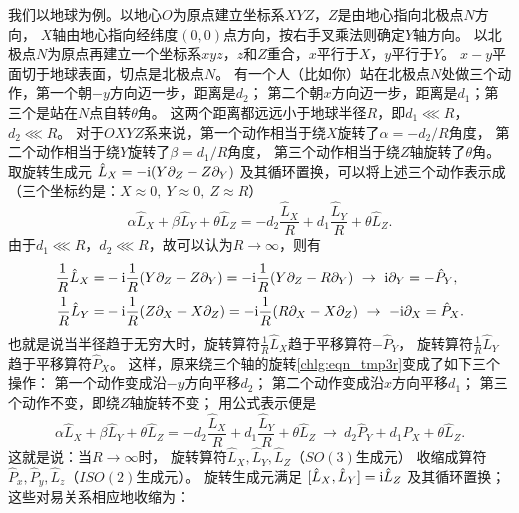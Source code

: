 我们以地球为例。以地心$O$为原点建立坐标系$XYZ$，$Z$是由地心指向北极点$N$方向，
$X$轴由地心指向经纬度$(0,0)$点方向，按右手叉乘法则确定$Y$轴方向。
以北极点$N$为原点再建立一个坐标系$xyz$，$z$和$Z$重合，$x$平行于$X$，$y$平行于$Y$。
$x-y$平面切于地球表面，切点是北极点$N$。
有一个人（比如你）站在北极点$N$处做三个动作，第一个朝$-y$方向迈一步，距离是$d_2$；
第二个朝$x$方向迈一步，距离是$d_1$；第三个是站在$N$点自转$\theta$角。
这两个距离都远远小于地球半径$R$，即$d_1 \lll R$，$d_2\lll R$。
对于$OXYZ$系来说，第一个动作相当于绕$X$旋转了$\alpha=-d_2/R$角度，
第二个动作相当于绕$Y$旋转了$\beta=d_1/R$角度，
第三个动作相当于绕$Z$轴旋转了$\theta$角。
取旋转生成元 $\hat L_X=-\mathrm{i}(Y\partial_Z-Z\partial_Y)$ 及其循环置换，可以将上述三个动作表示成
（三个坐标约是：$X\approx 0,\ Y\approx 0,\  Z\approx R$）
\begin{equation}\label{chlg:eqn_tmp3r}
    \alpha \hat{L}_X + \beta \hat{L}_Y + \theta \hat{L}_Z
    =-d_2\frac{\hat{L}_X}{R}  + d_1\frac{\hat{L}_Y}{R}  + \theta \hat{L}_Z.
\end{equation}
由于$d_1 \lll R$，$d_2\lll R$，故可以认为$R\to \infty$，则有
    \begin{align*}
        \frac{1}{R}\hat{L}_X =& -\mathrm{i} \frac{1}{R} (Y \partial_Z - Z \partial_Y )
        =-\mathrm{i} \frac{1}{R} (Y \partial_Z - R \partial_Y )
        \ \to\ \mathrm{i} \partial_Y = -\hat{P}_Y, \\
        \frac{1}{R}\hat{L}_Y =& -\mathrm{i} \frac{1}{R} (Z \partial_X - X \partial_Z )
        =-\mathrm{i} \frac{1}{R} (R \partial_X - X \partial_Z )
        \ \to\ -\mathrm{i} \partial_X = \hat{P}_X .
    \end{align*}
也就是说当半径趋于无穷大时，旋转算符$\frac{1}{R}\hat{L}_X$趋于平移算符$-\hat{P}_Y$，
旋转算符$\frac{1}{R}\hat{L}_Y$趋于平移算符$\hat{P}_X$。
这样，原来绕三个轴的旋转\eqref{chlg:eqn_tmp3r}变成了如下三个操作：
第一个动作变成沿$-y$方向平移$d_2$；
第二个动作变成沿$x$方向平移$d_1$；
第三个动作不变，即绕$Z$轴旋转不变；
用公式表示便是
\begin{equation}
    \alpha \hat{L}_X + \beta \hat{L}_Y + \theta \hat{L}_Z
    =-d_2\frac{\hat{L}_X}{R}  + d_1\frac{\hat{L}_Y}{R}  + \theta \hat{L}_Z
    \ \to \    d_2\hat{P}_Y  + d_1 \hat{P}_X  + \theta \hat{L}_Z .
\end{equation}
这就是说：当$R\to \infty$时，
旋转算符$\hat{L}_X,\hat{L}_Y,\hat{L}_Z$（$SO(3)$生成元）
收缩成算符$\hat{P}_x,\hat{P}_y,\hat{L}_z$（$ISO(2)$生成元）。
旋转生成元满足 $[\hat L_X,\hat L_Y]=\mathrm{i}\hat L_Z$ 及其循环置换；这些对易关系相应地收缩为：

